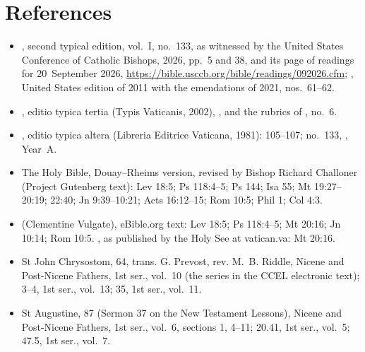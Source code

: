 \section*{References}

{\footnotesize
\begin{itemize}\setlength{\itemsep}{0pt}\setlength{\parskip}{0pt}
\item {}, second typical edition, vol.~I, no.~133, as witnessed by the United States Conference of Catholic Bishops,  2026, pp.~5 and 38, and its page of readings for 20~September 2026, \url{https://bible.usccb.org/bible/readings/092026.cfm}; , United States edition of 2011 with the emendations of 2021, nos.~61--62.
\item {}, editio typica tertia (Typis Vaticanis, 2002), , and the rubrics of , no.~6.
\item {}, editio typica altera (Libreria Editrice Vaticana, 1981):  105--107; no.~133, , Year~A.
\item The Holy Bible, Douay--Rheims version, revised by Bishop Richard Challoner (Project Gutenberg text): Lev 18:5; Ps 118:4--5; Ps 144; Isa 55; Mt 19:27--20:19; 22:40; Jn 9:39--10:21; Acts 16:12--15; Rom 10:5; Phil 1; Col 4:3.
\item {} (Clementine Vulgate), eBible.org text: Lev 18:5; Ps 118:4--5; Mt 20:16; Jn 10:14; Rom 10:5. , as published by the Holy See at vatican.va: Mt 20:16.
\item St John Chrysostom,  64, trans. G. Prevost, rev. M.~B. Riddle, Nicene and Post-Nicene Fathers, 1st ser., vol.~10 (the series in the CCEL electronic text);  3--4, 1st ser., vol.~13;  35, 1st ser., vol.~11.
\item St Augustine,  87 (Sermon 37 on the New Testament Lessons), Nicene and Post-Nicene Fathers, 1st ser., vol.~6, sections 1, 4--11;  20.41, 1st ser., vol.~5;  47.5, 1st ser., vol.~7.

\end{itemize}}
